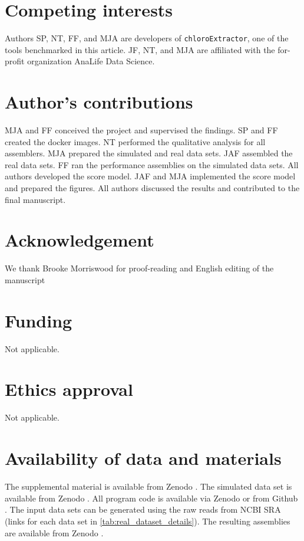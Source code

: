 \documentclass{bmcart}
\newcommand{\formatprogramnames}[1]{\texttt{#1}}
\newcommand{\ce}{\formatprogramnames{chloroExtractor}}
\begin{document}
\begin{backmatter}

\section*{Competing interests}
Authors  SP, NT, FF, and MJA are developers of \ce{}, one of the tools benchmarked in this article.
JF, NT, and MJA are affiliated with the for-profit organization AnaLife Data Science.

\section*{Author's contributions}
MJA and FF conceived the project and supervised the findings.
SP and FF created the docker images.
NT performed the qualitative analysis for all assemblers.
MJA prepared the simulated and real data sets.
JAF assembled the real data sets.
FF ran the performance assemblies on the simulated data sets.
All authors developed the score model.
JAF and MJA implemented the score model and prepared the figures.
All authors discussed the results and contributed to the final manuscript.

\section*{Acknowledgement}
We thank Brooke Morriswood for proof-reading and English editing of the manuscript

\section*{Funding}
Not applicable.

\section*{Ethics approval}
Not applicable.

\section*{Availability of data and materials}
The supplemental material is available from Zenodo \cite{zenodosupplement}. 
The simulated data set is available from Zenodo \cite{zenododataset}.
All program code is available via Zenodo \cite{zenodorepo} or from Github \cite{github-benchmark-repo}.
The input data sets can be generated using the raw reads from NCBI SRA (links for each data set in \cref{tab:real_dataset_details}).
The resulting assemblies are available from Zenodo \cite{zenodoassemblies}.


\end{backmatter}
\end{document}
